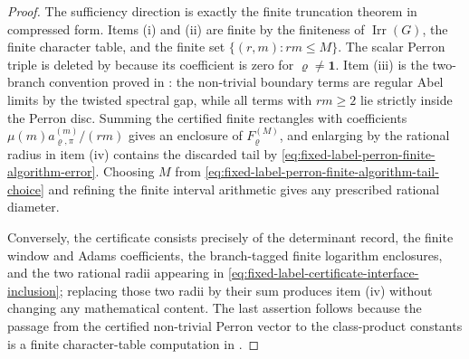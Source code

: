 \documentclass[11pt,a4paper]{amsart}
\theoremstyle{plain}
\theoremstyle{definition}
\theoremstyle{remark}
\DeclareMathOperator{\Irr}{Irr}
\begin{document}
\begin{proof}
  The sufficiency direction is exactly the finite truncation theorem in
  compressed form.  Items \textup{(i)} and
  \textup{(ii)} are finite by the finiteness of \(\Irr(G)\), the finite
  character table, and the finite set \(\{(r,m):rm\le M\}\).  The scalar
  Perron triple is deleted by
  because its coefficient is zero for \(\varrho\ne\mathbf1\).  Item
  \textup{(iii)} is the two-branch convention proved in
  : the non-trivial boundary
  terms are regular Abel limits by the twisted spectral gap, while all terms
  with \(rm\ge2\) lie strictly inside the Perron disc.  Summing the certified
  finite rectangles with coefficients
  \(\mu(m)a_{\varrho,
  \pi}^{(m)}/(rm)\) gives an enclosure of
  \(F_\varrho^{(M)}\), and enlarging by the rational radius in item
  \textup{(iv)} contains the discarded tail by
  \eqref{eq:fixed-label-perron-finite-algorithm-error}.  Choosing \(M\) from
  \eqref{eq:fixed-label-perron-finite-algorithm-tail-choice} and refining the
  finite interval arithmetic gives any prescribed rational diameter.

  Conversely, the certificate consists precisely of the determinant
  record, the finite window and Adams coefficients, the branch-tagged finite
  logarithm enclosures, and the two rational radii appearing in
  \eqref{eq:fixed-label-certificate-interface-inclusion}; replacing those
  two radii by their sum produces item \textup{(iv)} without changing any
  mathematical content.  The last assertion follows because the passage from
  the certified non-trivial Perron vector to the class-product constants is a
    finite character-table computation in
  .
\end{proof}
\end{document}
